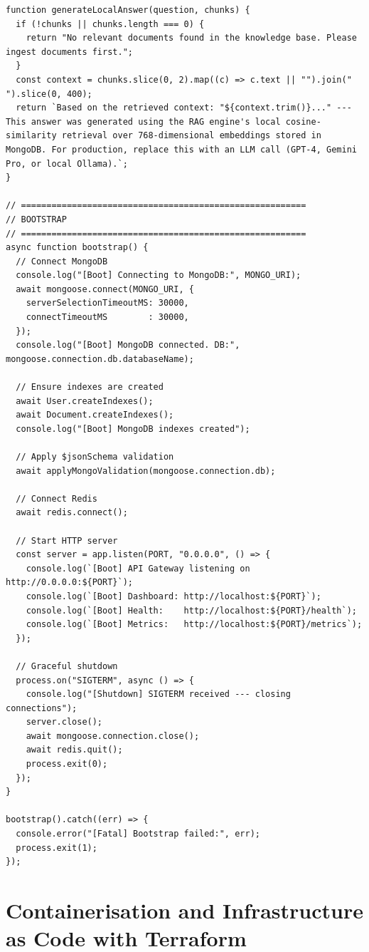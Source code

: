 \documentclass[12pt,a4paper]{report}
\begin{document}
\begin{lstlisting}
function generateLocalAnswer(question, chunks) {
  if (!chunks || chunks.length === 0) {
    return "No relevant documents found in the knowledge base. Please ingest documents first.";
  }
  const context = chunks.slice(0, 2).map((c) => c.text || "").join(" ").slice(0, 400);
  return `Based on the retrieved context: "${context.trim()}..." --- This answer was generated using the RAG engine's local cosine-similarity retrieval over 768-dimensional embeddings stored in MongoDB. For production, replace this with an LLM call (GPT-4, Gemini Pro, or local Ollama).`;
}

// ========================================================
// BOOTSTRAP
// ========================================================
async function bootstrap() {
  // Connect MongoDB
  console.log("[Boot] Connecting to MongoDB:", MONGO_URI);
  await mongoose.connect(MONGO_URI, {
    serverSelectionTimeoutMS: 30000,
    connectTimeoutMS        : 30000,
  });
  console.log("[Boot] MongoDB connected. DB:", mongoose.connection.db.databaseName);

  // Ensure indexes are created
  await User.createIndexes();
  await Document.createIndexes();
  console.log("[Boot] MongoDB indexes created");

  // Apply $jsonSchema validation
  await applyMongoValidation(mongoose.connection.db);

  // Connect Redis
  await redis.connect();

  // Start HTTP server
  const server = app.listen(PORT, "0.0.0.0", () => {
    console.log(`[Boot] API Gateway listening on http://0.0.0.0:${PORT}`);
    console.log(`[Boot] Dashboard: http://localhost:${PORT}`);
    console.log(`[Boot] Health:    http://localhost:${PORT}/health`);
    console.log(`[Boot] Metrics:   http://localhost:${PORT}/metrics`);
  });

  // Graceful shutdown
  process.on("SIGTERM", async () => {
    console.log("[Shutdown] SIGTERM received --- closing connections");
    server.close();
    await mongoose.connection.close();
    await redis.quit();
    process.exit(0);
  });
}

bootstrap().catch((err) => {
  console.error("[Fatal] Bootstrap failed:", err);
  process.exit(1);
});
\end{lstlisting}
\newpage


\chapter{Containerisation and Infrastructure as Code with Terraform}
\end{document}
